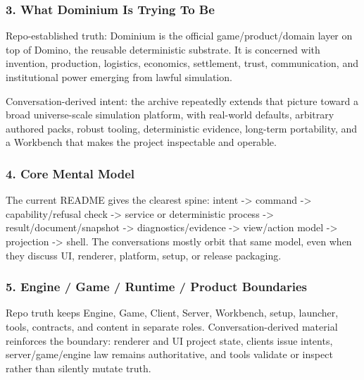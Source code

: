 \documentclass[9pt,a4paper,openany]{book}
\begin{document}
\subsubsection{3. What Dominium Is Trying To Be}

Repo-\allowbreak{}established truth: Dominium is the official game/\allowbreak{}product/\allowbreak{}domain layer on top of Domino, the reusable deterministic substrate.\allowbreak{} It is concerned with invention, production, logistics, economics, settlement, trust, communication, and institutional power emerging from lawful simulation.\allowbreak{}


Conversation-\allowbreak{}derived intent: the archive repeatedly extends that picture toward a broad universe-\allowbreak{}scale simulation platform, with real-\allowbreak{}world defaults, arbitrary authored packs, robust tooling, deterministic evidence, long-\allowbreak{}term portability, and a Workbench that makes the project inspectable and operable.\allowbreak{}


\subsubsection{4. Core Mental Model}

The current README gives the clearest spine: intent -\allowbreak{}> command -\allowbreak{}> capability/\allowbreak{}refusal check -\allowbreak{}> service or deterministic process -\allowbreak{}> result/\allowbreak{}document/\allowbreak{}snapshot -\allowbreak{}> diagnostics/\allowbreak{}evidence -\allowbreak{}> view/\allowbreak{}action model -\allowbreak{}> projection -\allowbreak{}> shell.\allowbreak{} The conversations mostly orbit that same model, even when they discuss UI, renderer, platform, setup, or release packaging.\allowbreak{}


\subsubsection{5. Engine / Game / Runtime / Product Boundaries}

Repo truth keeps Engine, Game, Client, Server, Workbench, setup, launcher, tools, contracts, and content in separate roles.\allowbreak{} Conversation-\allowbreak{}derived material reinforces the boundary: renderer and UI project state, clients issue intents, server/\allowbreak{}game/\allowbreak{}engine law remains authoritative, and tools validate or inspect rather than silently mutate truth.\allowbreak{}
\end{document}
